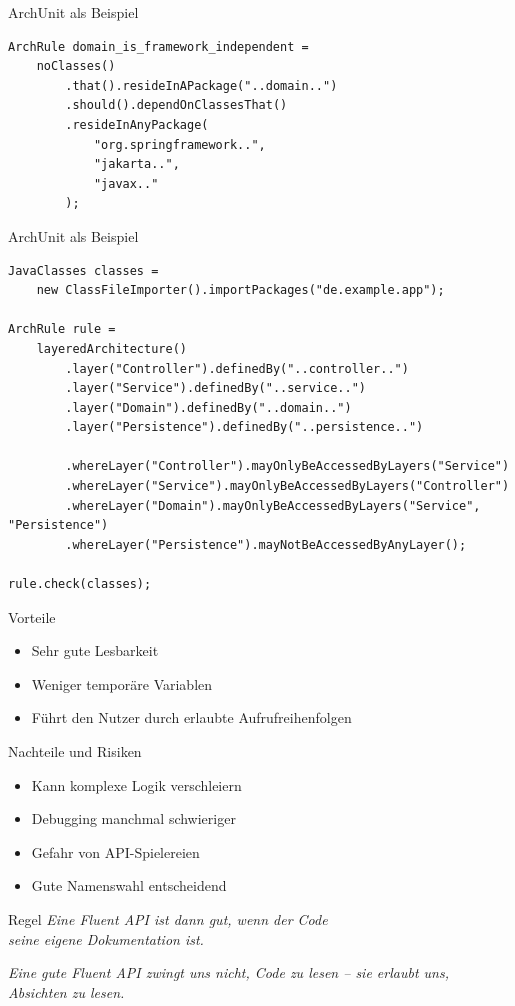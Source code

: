 \begin{frame}[fragile]{ArchUnit als Beispiel}
	\begin{lstlisting}[basicstyle=\tiny]
ArchRule domain_is_framework_independent =
    noClasses()
        .that().resideInAPackage("..domain..")
        .should().dependOnClassesThat()
        .resideInAnyPackage(
            "org.springframework..",
            "jakarta..",
            "javax.."
        );

	\end{lstlisting}
\end{frame}

\begin{frame}[fragile]{ArchUnit als Beispiel}
	\begin{lstlisting}[basicstyle=\tiny]
JavaClasses classes =
    new ClassFileImporter().importPackages("de.example.app");

ArchRule rule =
    layeredArchitecture()
        .layer("Controller").definedBy("..controller..")
        .layer("Service").definedBy("..service..")
        .layer("Domain").definedBy("..domain..")
        .layer("Persistence").definedBy("..persistence..")

        .whereLayer("Controller").mayOnlyBeAccessedByLayers("Service")
        .whereLayer("Service").mayOnlyBeAccessedByLayers("Controller")
        .whereLayer("Domain").mayOnlyBeAccessedByLayers("Service", "Persistence")
        .whereLayer("Persistence").mayNotBeAccessedByAnyLayer();

rule.check(classes);
	\end{lstlisting}
\end{frame}

\begin{frame}{Vorteile}
	\begin{itemize}
		\item Sehr gute Lesbarkeit
		\item Weniger temporäre Variablen
		\item Führt den Nutzer durch erlaubte Aufrufreihenfolgen
	\end{itemize}
\end{frame}


\begin{frame}{Nachteile und Risiken}
	\begin{itemize}
		\item Kann komplexe Logik verschleiern
		\item Debugging manchmal schwieriger
		\item Gefahr von \glqq API-Spielereien\grqq
		\item Gute Namenswahl entscheidend
	\end{itemize}
\end{frame}

\begin{frame}{Regel}
\centering
\Large
\emph{Eine Fluent API ist dann gut, wenn der Code\\
seine eigene Dokumentation ist.}

\emph{Eine gute Fluent API zwingt uns nicht, Code zu lesen –
sie erlaubt uns, Absichten zu lesen.}
\end{frame}
